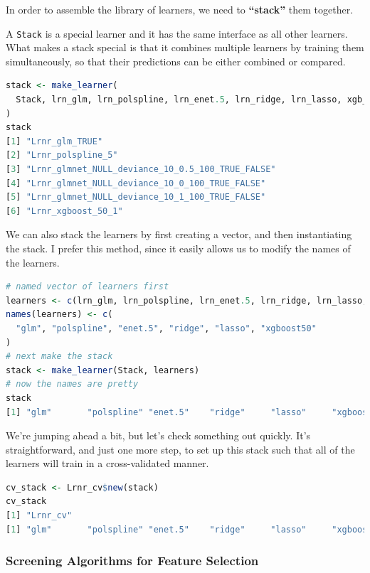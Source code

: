 \documentclass[12pt, krantz2,]{krantz}
\newcommand{\passthrough}[1]{#1}
\theoremstyle{definition}
\theoremstyle{definition}
\theoremstyle{definition}
\newcommand{\1}{\mathbbm{1}}
\begin{document}
In order to assemble the library of learners, we need to \textbf{``stack''} them
together.

A \passthrough{\lstinline!Stack!} is a special learner and it has the same interface as all other
learners. What makes a stack special is that it combines multiple learners by
training them simultaneously, so that their predictions can be either combined
or compared.

\begin{lstlisting}[language=R]
stack <- make_learner(
  Stack, lrn_glm, lrn_polspline, lrn_enet.5, lrn_ridge, lrn_lasso, xgb_50
)
stack
[1] "Lrnr_glm_TRUE"                                  
[2] "Lrnr_polspline_5"                               
[3] "Lrnr_glmnet_NULL_deviance_10_0.5_100_TRUE_FALSE"
[4] "Lrnr_glmnet_NULL_deviance_10_0_100_TRUE_FALSE"  
[5] "Lrnr_glmnet_NULL_deviance_10_1_100_TRUE_FALSE"  
[6] "Lrnr_xgboost_50_1"                              
\end{lstlisting}

We can also stack the learners by first creating a vector, and then
instantiating the stack. I prefer this method, since it easily allows us to
modify the names of the learners.

\begin{lstlisting}[language=R]
# named vector of learners first
learners <- c(lrn_glm, lrn_polspline, lrn_enet.5, lrn_ridge, lrn_lasso, xgb_50)
names(learners) <- c(
  "glm", "polspline", "enet.5", "ridge", "lasso", "xgboost50"
)
# next make the stack
stack <- make_learner(Stack, learners)
# now the names are pretty
stack
[1] "glm"       "polspline" "enet.5"    "ridge"     "lasso"     "xgboost50"
\end{lstlisting}

We're jumping ahead a bit, but let's check something out quickly. It's
straightforward, and just one more step, to set up this stack such that all of
the learners will train in a cross-validated manner.

\begin{lstlisting}[language=R]
cv_stack <- Lrnr_cv$new(stack)
cv_stack
[1] "Lrnr_cv"
[1] "glm"       "polspline" "enet.5"    "ridge"     "lasso"     "xgboost50"
\end{lstlisting}

\hypertarget{screening-algorithms-for-feature-selection}{%
\subsubsection{Screening Algorithms for Feature Selection}\label{screening-algorithms-for-feature-selection}}
\end{document}
